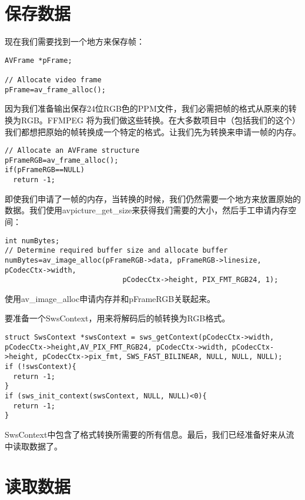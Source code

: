 \section{保存数据}

现在我们需要找到一个地方来保存帧：
\begin{lstlisting}
AVFrame *pFrame;

// Allocate video frame
pFrame=av_frame_alloc();
\end{lstlisting}

因为我们准备输出保存24位RGB色的PPM文件，我们必需把帧的格式从原来的转换为RGB。FFMPEG 将为我们做这些转换。在大多数项目中（包括我们的这个）我们都想把原始的帧转换成一个特定的格式。让我们先为转换来申请一帧的内存。
\begin{lstlisting}
// Allocate an AVFrame structure
pFrameRGB=av_frame_alloc();
if(pFrameRGB==NULL)
  return -1;
\end{lstlisting}

即使我们申请了一帧的内存，当转换的时候，我们仍然需要一个地方来放置原始的数据。我们使用avpicture_get_size来获得我们需要的大小，然后手工申请内存空间：

\begin{lstlisting}
int numBytes;
// Determine required buffer size and allocate buffer
numBytes=av_image_alloc(pFrameRGB->data, pFrameRGB->linesize, pCodecCtx->width,
                            pCodecCtx->height, PIX_FMT_RGB24, 1);
\end{lstlisting}

使用av_image_alloc申请内存并和pFrameRGB关联起来。

要准备一个SwsContext，用来将解码后的帧转换为RGB格式。
\begin{lstlisting}
struct SwsContext *swsContext = sws_getContext(pCodecCtx->width, pCodecCtx->height,AV_PIX_FMT_RGB24, pCodecCtx->width, pCodecCtx->height, pCodecCtx->pix_fmt, SWS_FAST_BILINEAR, NULL, NULL, NULL);
if (!swsContext){
  return -1;
}
if (sws_init_context(swsContext, NULL, NULL)<0){
  return -1;
}
\end{lstlisting}

SwsContext中包含了格式转换所需要的所有信息。最后，我们已经准备好来从流中读取数据了。

\section{读取数据}


